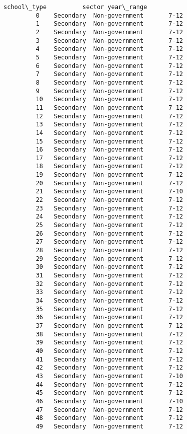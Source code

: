 \documentclass[11pt]{article}
\begin{document}
\begin{Verbatim}[commandchars=\\\{\}]
            school\_type          sector year\_range  
         0    Secondary  Non-government       7-12  
         1    Secondary  Non-government       7-12  
         2    Secondary  Non-government       7-12  
         3    Secondary  Non-government       7-12  
         4    Secondary  Non-government       7-12  
         5    Secondary  Non-government       7-12  
         6    Secondary  Non-government       7-12  
         7    Secondary  Non-government       7-12  
         8    Secondary  Non-government       7-12  
         9    Secondary  Non-government       7-12  
         10   Secondary  Non-government       7-12  
         11   Secondary  Non-government       7-12  
         12   Secondary  Non-government       7-12  
         13   Secondary  Non-government       7-12  
         14   Secondary  Non-government       7-12  
         15   Secondary  Non-government       7-12  
         16   Secondary  Non-government       7-12  
         17   Secondary  Non-government       7-12  
         18   Secondary  Non-government       7-12  
         19   Secondary  Non-government       7-12  
         20   Secondary  Non-government       7-12  
         21   Secondary  Non-government       7-10  
         22   Secondary  Non-government       7-12  
         23   Secondary  Non-government       7-12  
         24   Secondary  Non-government       7-12  
         25   Secondary  Non-government       7-12  
         26   Secondary  Non-government       7-12  
         27   Secondary  Non-government       7-12  
         28   Secondary  Non-government       7-12  
         29   Secondary  Non-government       7-12  
         30   Secondary  Non-government       7-12  
         31   Secondary  Non-government       7-12  
         32   Secondary  Non-government       7-12  
         33   Secondary  Non-government       7-12  
         34   Secondary  Non-government       7-12  
         35   Secondary  Non-government       7-12  
         36   Secondary  Non-government       7-12  
         37   Secondary  Non-government       7-12  
         38   Secondary  Non-government       7-12  
         39   Secondary  Non-government       7-12  
         40   Secondary  Non-government       7-12  
         41   Secondary  Non-government       7-12  
         42   Secondary  Non-government       7-12  
         43   Secondary  Non-government       7-10  
         44   Secondary  Non-government       7-12  
         45   Secondary  Non-government       7-12  
         46   Secondary  Non-government       7-10  
         47   Secondary  Non-government       7-12  
         48   Secondary  Non-government       7-12  
         49   Secondary  Non-government       7-12  
\end{Verbatim}
            
\end{document}

